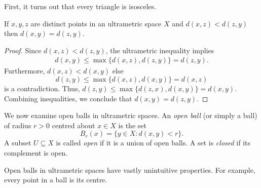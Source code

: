 First, it turns out that every triangle is isosceles.
\begin{lemma}
\label{lem:1}
If \( x, y, z \) are distinct points in an ultrametric space \( X \) and \( d(x,z) < d(z,y) \) then \( d(x, y) = d(z,y) \).
\end{lemma}
\begin{proof}
Since \( d(x,z) < d(z,y) \), the ultrametric inequality implies
\begin{align*}
d(x,y) \leq \max \{ d(x,z), d(z,y) \} = d(z,y).
\end{align*}
Furthermore, \( d(x,z) < d(x,y) \) else \[ d(z,y) \leq \max \{ d(x,z), d(x,y) \} = d(x,z) \] is a contradiction. Thus, \( d(z , y) \leq \max \{ d(z,x), d(x,y) \} = d(x,y) \). Combining inequalities, we conclude that \( d(x,y) = d(z,y) \).
\end{proof}

We now examine open balls in ultrametric spaces. An \emph{open ball} (or simply a ball) of radius \( r > 0 \) centred about \( x \in X \) is the set \[ B_{r }(x) = \{ y \in X : d(x,y) < r \}. \] A subset \( U \subseteq X \) is called \emph{open} if it is a union of open balls. A set is \emph{closed} if its complement is open.

Open balls in ultrametric spaces have vastly unintuitive properties. For example, every point in a ball is its centre.

